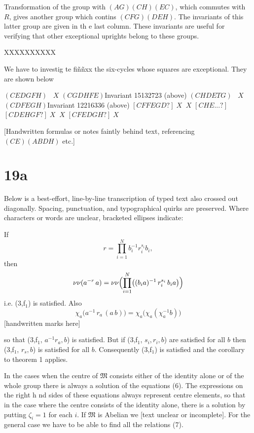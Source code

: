 \documentclass[12pt]{article}
\begin{document}
Transformation of the grou\(\mathrm{p}\) with \((AG)(CH)(EC)\), which commutes
with \(R\), gives another group which contins \((CFG)(DEH)\).
The invariants of this latter group are given in th e
last column. These invariants are useful for verifying
that other exceptional uprights belong to these groups.

XXXXXXXXXX

We have to investig te fi\~{n}\~{n}xx the six-cycles whose squares
are exceptional. They are shown below

\((CEDGFH)\)\quad\(\;\;\;X\)
\((CGDHFE)\)\quad Invariant 15132723 (above)
\((CHDETG)\)\quad\(\;\;\;X\)
\((CDFEGH)\)\quad Invariant 12216336 (above)
\([CFFEGD?]\)\quad \(\;X\;\;X\)
\([CHE... ?]\)
\([CDEHGF?]\)\quad \(\;X\;\;X\)
\([CFEDGH?]\)\quad \(\;X\)

[Handwritten formulas or notes faintly behind text, referencing \((CE)(ABDH)\) etc.]

\section{19a}

Below is a best-effort, line-by-line transcription of typed text also crossed out diagonally. 
Spacing, punctuation, and typographical quirks are preserved. 
Where characters or words are unclear, bracketed ellipses indicate:

\bigskip

\noindent
If
\[
r = \prod_{i=1}^{N} b_i^{-1} r_i^{s_i} b_i,
\]
then 
\[
\nu\nu(a^{-r} \, a) = \nu\nu\Bigl(\prod_{i=1}^{N} \bigl((b_i a)^{-1} \, r_i^{s_i} \, b_i a \bigr)\Bigr)
\]
i.e. (3,f\(_1\)) is satisfied. Also
\[
\chi_a\bigl(a^{-1} \, r_a \, (a \, b)\bigr)
  = \chi_a\bigl(\chi_a(\chi_a^{-1} b)\bigr)
\]
[handwritten marks here]

so that (3,f\(_1\), \(a^{-1} r_a, b\)) is satisfied. But if (3,f\(_1\), \(s_i, r_i, b\))
are satisfied for all \(b\) then (3,f\(_1\), \(r_s, b\)) is satisfied for all \(b\).
Consequently (3,f\(_1\)) is satisfied and the corollary to theorem 1 applies.

In the cases when the centre of \(\mathfrak{M}\) consists either of the
identity alone or of the whole group there is always a solution
of the equations (6). The expressions on the right h nd sides
of these equations always represent centre elements, so that
in the case where the centre consists of the identity alone,
there is a solution by putting \(\zeta_i = 1\) for each \(i\). If \(\mathfrak{M}\) is Abelian
we [text unclear or incomplete]. For the general case we have
to be able to find all the relations (7).
\end{document}
